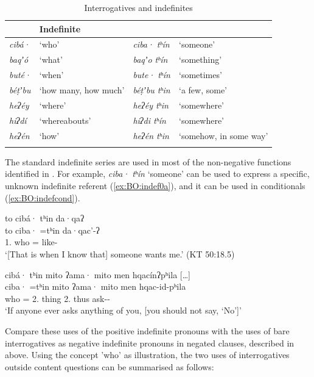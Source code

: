 \documentclass[output=paper,modfonts,nonflat,colorlinks,citecolor=brown]{langscibook}
\begin{document}
\begin{table}[htb]
\caption{Interrogatives and indefinites}
\label{tab:BO:indef}
 \begin{tabular}{llll}
  \lsptoprule
\multicolumn{2}{l}{Interrogative} & \multicolumn{2}{l}{Indefinite} \\
  \midrule
\itshape cibá· & `who' & \itshape ciba· tʰín & `someone' \\
\itshape baqʼó & `what' & \itshape baqʼo tʰín & `something' \\
\itshape buté· & `when' & \itshape bute· tʰín & `sometimes'\\
\itshape béṭʼbu & `how many, how much' & \itshape béṭʼbu tʰin & `a few, some'\\
\itshape heʔéy & `where' & \itshape heʔéy tʰin & `somewhere' \\
\itshape hiʔdí & `whereabouts' & \itshape hiʔdi tʰín & `somewhere' \\
\itshape heʔén & `how' & \itshape heʔén tʰin & `somehow, in some way' \\
  \lspbottomrule
 \end{tabular}
\end{table}

The standard indefinite series are used in most of the non-negative functions identified in \citet{Haspelmath1997}. For example, \textit{ciba· tʰín} `someone' can be used to express a specific, unknown indefinite referent (\ref{ex:BO:indef0a}), and it can be used in conditionals (\ref{ex:BO:indefcond}).

\ea 
\label{ex:BO:indef0a}
\glll {[\ldots]} to cibá· tʰin da·qaʔ\\
{} to ciba· =tʰin da·qac'-ʔ\\
 {} 1. who = like-\\
\glt `[That is when I know that] someone wants me.' ({KT 50:18.5})\\
\z

\ea
\label{ex:BO:indefcond}
\glll cibá· tʰin mito ʔama· mito men hqacínʔpʰila [\ldots]\\
 ciba· =tʰin mito ʔama· mito men hqac-id-pʰila {}\\
 who = 2. thing 2. thus ask-- {}\\
\glt `If anyone ever asks anything of you, [you should not say, ‘No’]'
\z

\noindent Compare these uses of the positive indefinite pronouns with the uses of bare interrogatives as negative indefinite pronouns in negated clauses, described in  above. Using the concept 'who' as illustration, the two uses of interrogatives outside content questions can be summarised as follows:
\end{document}
